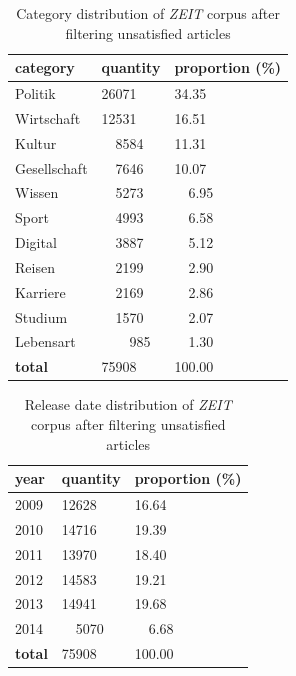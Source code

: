 \begin{table}[!ht]
\centering
\begin{tabularx}{0.7\textwidth}{XXX}
\hline
\textbf{category} &   \textbf{quantity} &   \textbf{proportion (\%)} \\
\hline
Politik      &      26071 &            34.35 \\
Wirtschaft   &      12531 &            16.51 \\
Kultur       &       ~~8584 &            11.31 \\
Gesellschaft &       ~~7646 &            10.07 \\
Wissen       &       ~~5273 &             ~~6.95 \\
Sport        &       ~~4993 &             ~~6.58 \\
Digital      &       ~~3887 &             ~~5.12 \\
Reisen       &       ~~2199 &             ~~2.90 \\
Karriere     &       ~~2169 &             ~~2.86 \\
Studium      &       ~~1570 &             ~~2.07 \\
Lebensart    &       ~~~~985 &             ~~1.30 \\
\hline
\textbf{total}        &      75908 &           100.00 \\
\hline
\end{tabularx}
\caption{Category distribution of \textit{ZEIT} corpus after filtering unsatisfied articles}
\label{tab:cate_dist_new}
\end{table}

\begin{table}[!ht]
\centering
\begin{tabularx}{0.7\textwidth}{XXX}
\hline
\textbf{year} &   \textbf{quantity} &   \textbf{proportion (\%)} \\
\hline
2009 & 12628 &            16.64 \\
2010 & 14716 &            19.39 \\
2011 & 13970 &            18.40 \\
2012 & 14583 &            19.21 \\
2013 & 14941 &            19.68 \\
2014 &  ~~5070 &            ~~6.68 \\
\hline
\textbf{total} & 75908 &           100.00 \\
\hline
\end{tabularx}
\caption{Release date distribution of \textit{ZEIT} corpus after filtering unsatisfied articles}
\label{tab:release_dist_new}
\end{table}

